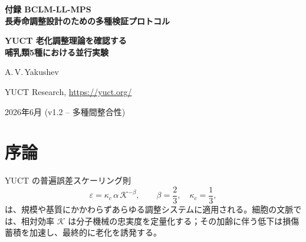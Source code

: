 \documentclass[12pt,a4paper]{ltjsarticle}
\newcommand{\REL}{\mathcal{K}}          %
\begin{document}
	
	\begin{titlepage}
		\centering
		\vspace*{2cm}
		{\Huge\bfseries 付録 BCLM-LL-MPS\\[0.3cm]
			長寿命調整設計のための多種検証プロトコル\par}
		\vspace{0.5cm}
		{\Large\bfseries YUCT 老化調整理論を確認する\\哺乳類5種における並行実験\par}
		\vspace{1.5cm}
		{\large A.\,V.\,Yakushev\par}
		{\normalsize YUCT Research, \url{https://yuct.org/}\par}
		\vspace{1.0cm}
		{\normalsize 2026年6月 (v1.2 – 多種間整合性)}\par
		\vfill
		\begin{abstract}
			\noindent
			YUCT 生物調整ラグランジアン (BCLM) は、配列データのみから任意のタンパク質や経路の調整効率 \(K_{\mathrm{eff}}\) を予測することを可能にする。老化の調整理論の普遍性を示すため、我々は広く使われている5種の実験用哺乳類——マウス (\textit{Mus musculus})、ラット (\textit{Rattus norvegicus})、ブタ (\textit{Sus scrofa})、カニクイザル (\textit{Macaca fascicularis})、イヌ (\textit{Canis familiaris})——に対する並行実験デザインを提示する。各々の種についてオルソログ標的遺伝子を同定し、BCLM パイプラインを用いて天然型と最適化型の相対調整効率 \(\REL\) を計算し、普遍誤差則 \(\varepsilon = \kappa_c \alpha \REL^{-\beta}\) (\(\beta=2/3\), \(\kappa_c=1/3\)) から突然変異率、酸化ストレス、タンパク質凝集、遊走速度、複製寿命の定量的予測を直接導出する。比較表にはヒト細胞の対応値（姉妹プロトコル BCLM‑LL より）も含む。実験は市販の細胞株、公開配列データベース、標準的な細胞生物学アッセイのみに依存する。制御回帰 (CCR) モジュールにより、老化表現型の可逆性を種横断的に確認する。全予測は事前登録され、反証可能である。プロトコルは \textit{in vivo} 送達法を意図的に省いており、倫理的側面は付録~\(\Sigma\) で議論する。
		\end{abstract}
	\end{titlepage}
	
	\tableofcontents
	\newpage
	
	\section{序論}
	\label{sec:intro}
	YUCT の普遍誤差スケーリング則
	\begin{equation}
		\varepsilon = \kappa_c \, \alpha \, \REL^{-\beta}, \qquad \beta = \frac{2}{3},\quad \kappa_c = \frac{1}{3},
		\label{eq:error-law}
	\end{equation}
	は、規模や基質にかかわらずあらゆる調整システムに適用される。細胞の文脈では、相対効率 \(\REL\) は分子機械の忠実度を定量化する；その加齢に伴う低下は損傷蓄積を加速し、最終的に老化を誘発する。
	
\end{document}
